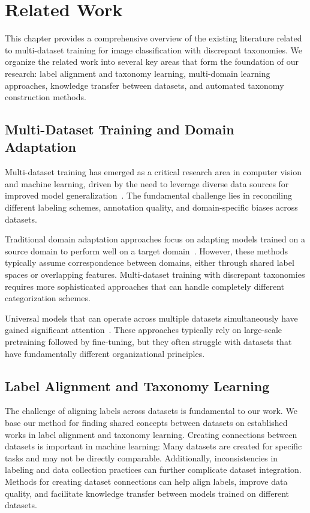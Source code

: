 \chapter{Related Work}

This chapter provides a comprehensive overview of the existing literature related to
multi-dataset training for image classification with discrepant taxonomies. We organize
the related work into several key areas that form the foundation of our research: label
alignment and taxonomy learning, multi-domain learning approaches, knowledge transfer
between datasets, and automated taxonomy construction methods.

\section{Multi-Dataset Training and Domain Adaptation}

Multi-dataset training has emerged as a critical research area in computer vision and
machine learning, driven by the need to leverage diverse data sources for improved model
generalization~\cite{zamir_taskonomy_2018}. The fundamental challenge lies in reconciling
different labeling schemes, annotation quality, and domain-specific biases across
datasets.

Traditional domain adaptation approaches focus on adapting models trained on a source
domain to perform well on a target domain~\cite{wang_deep_2018,ganin_domain-adversarial_2016}.
However, these methods typically assume correspondence between domains,
either through shared label spaces or overlapping features. Multi-dataset
training with discrepant taxonomies requires more sophisticated approaches that can
handle completely different categorization schemes.

Universal models that can operate across multiple datasets simultaneously
have gained significant attention~\cite{kolesnikov_big_2020,radford_learning_2021}.
These approaches typically rely on large-scale pretraining followed by fine-tuning,
but they often struggle with datasets that have fundamentally different organizational
principles.

\section{Label Alignment and Taxonomy Learning}

The challenge of aligning labels across datasets is fundamental to our work. We base our
method for finding shared concepts between datasets on established works in label alignment
and taxonomy learning. Creating connections between datasets is important in machine learning:
Many datasets are created for specific tasks and may not be directly comparable.
Additionally, inconsistencies in labeling and data collection practices can further
complicate dataset integration. Methods for creating dataset connections
can help align labels, improve data quality, and facilitate knowledge transfer
between models trained on different datasets.

